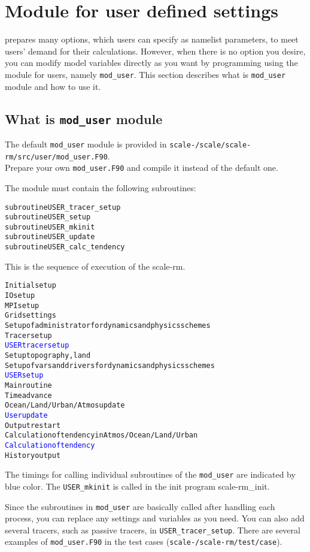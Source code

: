 \section{Module for user defined settings} \label{sec:mod_user}

\scalerm prepares many options, which users can specify as namelist parameters, to meet users' demand for their calculations.
However, when there is no option you desire, you can modify model variables directly as you want by programming using the module for users, namely \verb|mod_user|.
This section describes what is \verb|mod_user| module and how to use it.


\subsection{What is \texttt{mod\_user} module}

The default \verb|mod_user| module is provided in \texttt{scale-{\version}/scale/scale-rm/src/user/mod\_user.F90}.\\
Prepare your own \verb|mod_user.F90| and compile it instead of the default one.

The module must contain the following subroutines:
\begin{alltt}
  subroutine USER_tracer_setup
  subroutine USER_setup
  subroutine USER_mkinit
  subroutine USER_update
  subroutine USER_calc_tendency
\end{alltt}

\noindent This is the sequence of execution of the scale-rm.
\begin{alltt}
Initial setup
  IO setup
  MPI setup
  Grid settings
  Setup of administrator for dynamics and physics schemes 
  Tracer setup
  \textcolor{blue}{USER tracer setup}
  Setup topography, land
  Setup of vars and drivers for dynamics and physics schemes 
  \textcolor{blue}{USER setup}
Main routine
  Time advance
  Ocean/Land/Urban/Atmos update
  \textcolor{blue}{User update}
  Output restart
  Calculation of tendency in Atmos/Ocean/Land/Urban
  \textcolor{blue}{Calculation of tendency}
  History output
\end{alltt}
The timings for calling individual subroutines of the \verb|mod_user| are indicated by blue color.
The \verb|USER_mkinit| is called in the init program scale-rm\_init.


Since the subroutines in \verb|mod_user| are basically called after handling each process,
you can replace any settings and variables as you need.
You can also add several tracers, such as passive tracers, in \verb|USER_tracer_setup|.
There are several examples of \verb|mod_user.F90| in the test cases (\texttt{scale-{\version}/scale-rm/test/case}).

